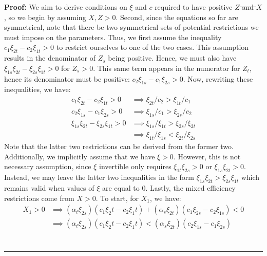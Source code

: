\documentclass[11pt,a4paper,leqno]{extarticle}
\newenvironment{proof}[1][Proof]{\noindent\textbf{#1:} }{\ \rule{0.5em}{0.5em}}
\providecommand{\DIFadd}[1]{{\protect\color{blue}\uwave{#1}}} %
\providecommand{\DIFdel}[1]{{\protect\color{red}\sout{#1}}}                      %
\providecommand{\DIFaddbegin}{} %
\providecommand{\DIFaddend}{} %
\providecommand{\DIFdelbegin}{} %
\providecommand{\DIFdelend}{} %
\begin{document}
\DIFdelbegin %
\DIFdelend \begin{proof}
	We aim to derive conditions on $\xi$ and $c$ required to have positive \DIFdelbegin \DIFdel{$Z$ and $X$}\DIFdelend \DIFaddbegin \DIFadd{$\mathbf{Z}$ and $\mathbf{X}$}\DIFaddend , so we begin by assuming \DIFdelbegin \DIFdel{$X, Z  > 0$}\DIFdelend \DIFaddbegin \DIFadd{$\mathbf{Z}, \mathbf{X} > 0$}\DIFaddend . Second, since the equations so far are symmetrical, note that there be two symmetrical sets of potential restrictions we must impose on the parameters. Thus, we first assume the inequality $c_1 \xi_{2t} - c_2 \xi_{1t} > 0$ to restrict ourselves to one of the two cases. This assumption results in the denominator of $Z_s$ being positive. Hence, we must also have $\xi_{1s}\xi_{2t} - \xi_{2s}\xi_{1t} > 0 $ for $Z_s > 0$. This same term appears in the numerator for $Z_t$, hence its denominator must be positive: $c_2 \xi_{1s} - c_1 \xi_{2s} > 0$. Now, rewriting these inequalities, we have:
	\begin{align*}
	c_1 \xi_{2t} - c_2 \xi_{1t} > 0 &\implies \xi_{2t}/c_2 > \xi_{1t}/c_1 \\
	c_2 \xi_{1s} - c_1 \xi_{2s} > 0 &\implies \xi_{1s}/c_1 > \xi_{2s}/c_2 \\
	\xi_{1s}\xi_{2t} - \xi_{2s}\xi_{1t} > 0 &\implies \xi_{1s}/\xi_{1t} > \xi_{2s}/\xi_{2t} \\
	&\implies \xi_{1t}/\xi_{1s} < \xi_{2t}/\xi_{2s} 
	\end{align*}
	Note that the latter two restrictions can be derived from the former two. Additionally, we implicitly assume that we have \DIFdelbegin \DIFdel{$\xi > 0$}\DIFdelend \DIFaddbegin \DIFadd{$\boldsymbol{\xi} > 0$}\DIFaddend . However, this is not necessary assumption, since \DIFdelbegin \DIFdel{$\xi$ }\DIFdelend \DIFaddbegin \DIFadd{$\boldsymbol{\xi}$ }\DIFaddend invertible only requires $\xi_{1t} \xi_{2s} > 0$ or $\xi_{1s} \xi_{2t} > 0$. Instead, we may leave the latter two inequalities in the form $ \xi_{1s}\xi_{2t} > \xi_{2s}\xi_{1t}$ which remains valid when values of $\xi$ are equal to $0$. Lastly, the mixed efficiency restrictions come from $X > 0$. To start, for $X_1$, we have:
	\begin{align*}
	X_1 > 0 &\implies (\alpha_t \xi_{2s})(c_1 \xi_2t - c_2\xi_1t) + (\alpha_s \xi_{2t})(c_1 \xi_{2s} - c_2 \xi_{1s}) < 0\\
	&\implies (\alpha_t \xi_{2s})(c_1 \xi_2t - c_2\xi_1t) < (\alpha_s \xi_{2t})(c_2 \xi_{1s} - c_1 \xi_{2s}) \\

\end{align*}
\end{proof}
\end{document}
